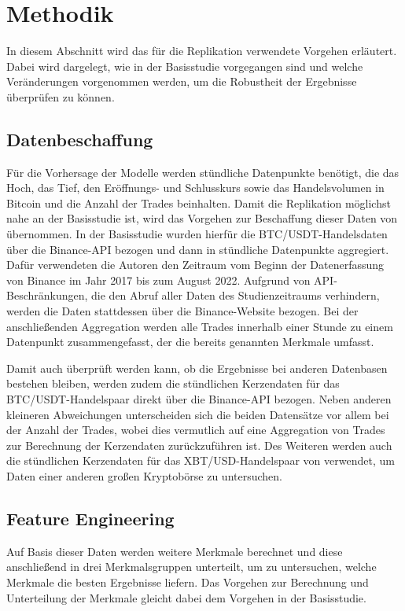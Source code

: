 \documentclass[a4paper, 12pt]{article}
\begin{document}
\section{Methodik}\label{sec:Methodik}
In diesem Abschnitt wird das für die Replikation verwendete Vorgehen erläutert.
Dabei wird dargelegt, wie \textcite{Goutte2023} in der Basisstudie vorgegangen sind und welche Veränderungen vorgenommen werden, um die Robustheit der Ergebnisse überprüfen zu können.

\subsection{Datenbeschaffung}
Für die Vorhersage der Modelle werden stündliche Datenpunkte benötigt, die das Hoch, das Tief, den Eröffnungs- und Schlusskurs sowie das Handelsvolumen in Bitcoin und die Anzahl der Trades beinhalten.
Damit die Replikation möglichst nahe an der Basisstudie ist, wird das Vorgehen zur Beschaffung dieser Daten von \textcite{Goutte2023} übernommen.
In der Basisstudie wurden hierfür die BTC/USDT-Handelsdaten über die Binance-API bezogen und dann in stündliche Datenpunkte aggregiert.
Dafür verwendeten die Autoren den Zeitraum vom Beginn der Datenerfassung von Binance im Jahr 2017 bis zum August 2022.
Aufgrund von API-Beschränkungen, die den Abruf aller Daten des Studienzeitraums verhindern, werden die Daten stattdessen über die Binance-Website \parencite{Binance} bezogen.
Bei der anschließenden Aggregation werden alle Trades innerhalb einer Stunde zu einem Datenpunkt zusammengefasst, der die bereits genannten Merkmale umfasst.

Damit auch überprüft werden kann, ob die Ergebnisse bei anderen Datenbasen bestehen bleiben, werden zudem die stündlichen Kerzendaten für das BTC/USDT-Handelspaar direkt über die Binance-API \parencite{Binance-Klines} bezogen.
Neben anderen kleineren Abweichungen unterscheiden sich die beiden Datensätze vor allem bei der Anzahl der Trades, wobei dies vermutlich auf eine Aggregation von Trades zur Berechnung der Kerzendaten zurückzuführen ist.
Des Weiteren werden auch die stündlichen Kerzendaten für das XBT/USD-Handelspaar von \textcite{Kraken} verwendet, um Daten einer anderen großen Kryptobörse zu untersuchen.

\subsection{Feature Engineering}
Auf Basis dieser Daten werden weitere Merkmale berechnet und diese anschließend in drei Merkmalsgruppen unterteilt, um zu untersuchen, welche Merkmale die besten Ergebnisse liefern.
Das Vorgehen zur Berechnung und Unterteilung der Merkmale gleicht dabei dem Vorgehen in der Basisstudie.
\end{document}
